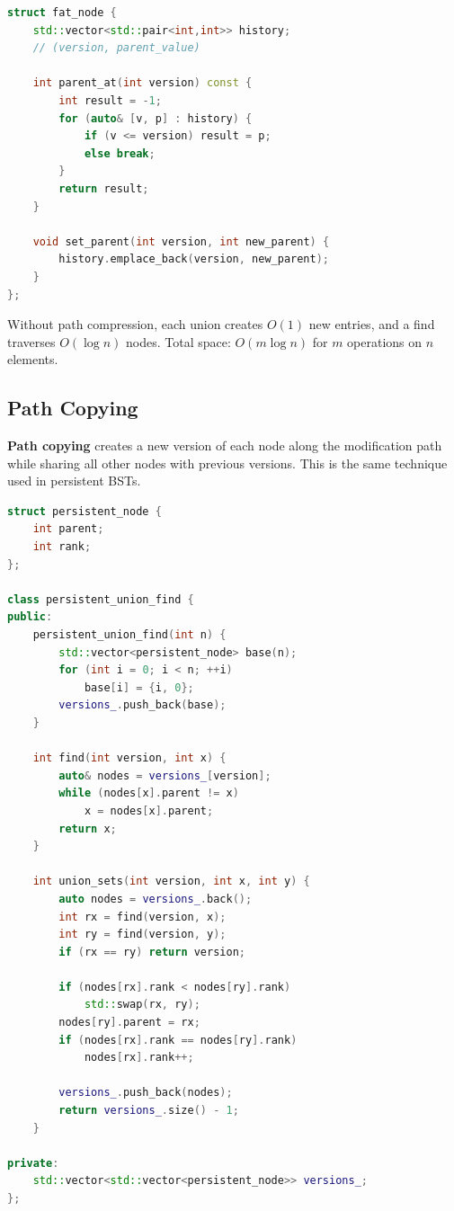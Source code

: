\begin{lstlisting}[language=C++]
struct fat_node {
    std::vector<std::pair<int,int>> history;
    // (version, parent_value)

    int parent_at(int version) const {
        int result = -1;
        for (auto& [v, p] : history) {
            if (v <= version) result = p;
            else break;
        }
        return result;
    }

    void set_parent(int version, int new_parent) {
        history.emplace_back(version, new_parent);
    }
};
\end{lstlisting}

Without path compression, each union creates $O(1)$ new entries, and a find traverses $O(\log n)$ nodes. Total space: $O(m \log n)$ for $m$ operations on $n$ elements.

\subsection{Path Copying}

\textbf{Path copying} creates a new version of each node along the modification path while sharing all other nodes with previous versions. This is the same technique used in persistent BSTs.

\begin{lstlisting}[language=C++]
struct persistent_node {
    int parent;
    int rank;
};

class persistent_union_find {
public:
    persistent_union_find(int n) {
        std::vector<persistent_node> base(n);
        for (int i = 0; i < n; ++i)
            base[i] = {i, 0};
        versions_.push_back(base);
    }

    int find(int version, int x) {
        auto& nodes = versions_[version];
        while (nodes[x].parent != x)
            x = nodes[x].parent;
        return x;
    }

    int union_sets(int version, int x, int y) {
        auto nodes = versions_.back();
        int rx = find(version, x);
        int ry = find(version, y);
        if (rx == ry) return version;

        if (nodes[rx].rank < nodes[ry].rank)
            std::swap(rx, ry);
        nodes[ry].parent = rx;
        if (nodes[rx].rank == nodes[ry].rank)
            nodes[rx].rank++;

        versions_.push_back(nodes);
        return versions_.size() - 1;
    }

private:
    std::vector<std::vector<persistent_node>> versions_;
};
\end{lstlisting}

